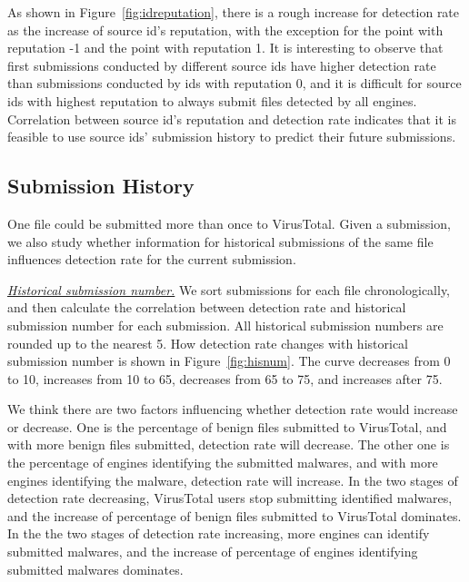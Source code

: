As shown in Figure~\ref{fig:idreputation}, 
there is a rough increase for detection rate as the increase of source id's reputation, 
with the exception for the point with reputation -1 and the point with reputation 1. 
It is interesting to observe that first submissions conducted by different source ids have higher 
detection rate than submissions conducted by ids with reputation 0, 
and it is difficult for source ids with highest reputation to always submit files detected by all engines. 
Correlation between source id's reputation and detection rate indicates 
that it is feasible to use source ids' submission history to predict their future submissions.



\subsection{Submission History}
\label{sec:history}



One file could be submitted more than once to VirusTotal. 
Given a submission, we also study whether information for historical 
submissions of the same file influences detection rate for the current submission. 

{\textit{\underline{Historical submission number.}}}
We sort submissions for each file chronologically, 
and then calculate the correlation between detection rate and historical submission number for each submission. 
All historical submission numbers are rounded up to the nearest 5. 
How detection rate changes with historical submission number is shown in Figure~\ref{fig:hisnum}. 
The curve decreases from 0 to 10, increases from 10 to 65, decreases from 65 to 75, and increases after 75. 

We think there are two factors influencing whether detection rate would increase or decrease.
One is the percentage of benign files submitted to VirusTotal, 
and with more benign files submitted, detection rate will decrease.   
The other one is the percentage of engines identifying the submitted malwares, 
and with more engines identifying the malware, detection rate will increase. 
In the two stages of detection rate decreasing, 
VirusTotal users stop submitting identified malwares, 
and the increase of percentage of benign files submitted to VirusTotal dominates. 
In the the two stages of detection rate increasing, 
more engines can identify submitted malwares, 
and the increase of percentage of engines identifying submitted malwares dominates. 

